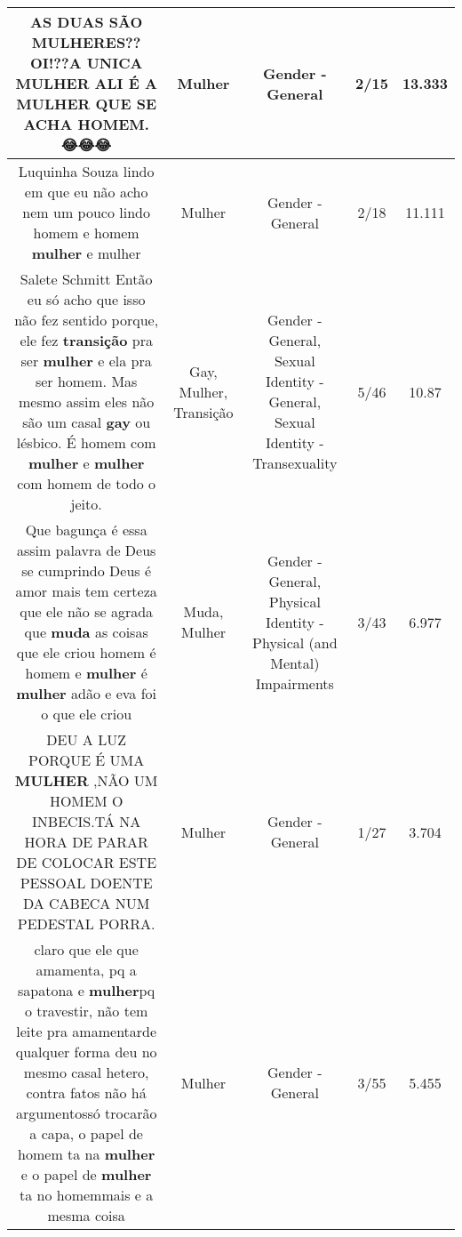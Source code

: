 \documentclass[11pt]{article}
\newlength\mylength
\begin{document}
\begin{center}
\begin{longtable}{|C{.65\mylength}|C{.30\mylength}|C{.12\mylength}|C{.12\mylength}|C{.12\mylength}|}
  \small AS DUAS SÃO MULHERES??OI!??A UNICA \textbf{MULHER} ALI É A \textbf{MULHER} QUE SE ACHA HOMEM. 😂😂😂\normalsize   & Mulher & Gender - General & 2/15 & 13.333 \\  \hline
  \small Luquinha Souza   lindo em que  eu não acho nem um pouco lindo  homem e homem  \textbf{mulher} e mulher\normalsize   & Mulher & Gender - General & 2/18 & 11.111 \\  \hline
  \small Salete Schmitt Então eu só acho que isso não fez sentido porque,  ele fez \textbf{transição} pra ser \textbf{mulher} e ela pra ser homem. Mas mesmo assim eles não são um casal \textbf{gay} ou lésbico. É homem com \textbf{mulher} e \textbf{mulher} com homem de todo o jeito.\normalsize   & Gay, Mulher, Transição & Gender - General, Sexual Identity - General, Sexual Identity - Transexuality & 5/46 & 10.87 \\  \hline
  \small Que bagunça é essa assim palavra de Deus se cumprindo Deus é amor mais tem certeza que ele não se agrada que \textbf{muda} as coisas que ele criou homem é homem e \textbf{mulher} é \textbf{mulher} adão e eva foi o que ele criou\normalsize   & Muda, Mulher & Gender - General, Physical Identity - Physical (and Mental) Impairments & 3/43 & 6.977 \\  \hline
  \small DEU A LUZ PORQUE É UMA \textbf{MULHER} ,NÃO UM HOMEM O INBECIS.TÁ NA HORA DE PARAR DE COLOCAR ESTE PESSOAL DOENTE DA CABECA NUM PEDESTAL PORRA.\normalsize   & Mulher & Gender - General & 1/27 & 3.704 \\  \hline
  \small claro que  ele que amamenta, pq a sapatona e \textbf{mulher}pq o travestir, não tem leite pra amamentarde qualquer forma deu no mesmo casal hetero, contra fatos não há argumentossó trocarão a capa, o papel de homem ta na \textbf{mulher} e o papel de \textbf{mulher} ta no homemmais e a mesma coisa\normalsize   & Mulher & Gender - General & 3/55 & 5.455 \\  \hline

\end{longtable}
\end{center}
\end{document}
